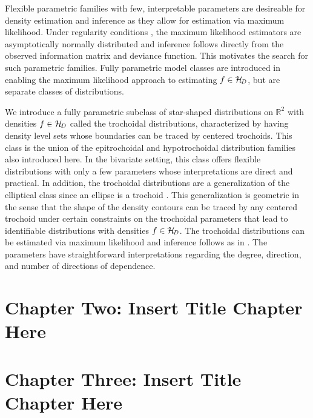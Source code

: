 \documentclass[]{article}
\numberwithin{equation}{section}
\newcommand{\HC}[1]{\cal{H}\!_{\mathit{#1}}} %
\newcommand{\R}{\mathbb{R}} %
\begin{document}
Flexible parametric families with few, interpretable parameters are desireable for density estimation and inference as they allow for estimation via maximum likelihood. Under regularity conditions \citep[Section 6.1]{Hogg2005}, the maximum likelihood estimators are asymptotically normally distributed and inference follows directly from the observed information matrix and deviance function. This motivates the search for such parametric families. Fully parametric model classes are introduced in \citet{Liebscher2020} enabling the maximum likelihood approach to estimating \(f \in \HC{D}\), but are separate classes of distributions.

We introduce a fully parametric subclass of star-shaped distributions on \(\R^2\) with densities \(f \in \HC{D}\) called the trochoidal distributions, characterized by having density level sets whose boundaries can be traced by centered trochoids. This class is the union of the epitrochoidal and hypotrochoidal distribution families also introduced here. In the bivariate setting, this class offers flexible distributions with only a few parameters whose interpretations are direct and practical. In addition, the trochoidal distributions are a generalization of the elliptical class since an ellipse is a trochoid \citep{Pedoe1975}. This generalization is geometric in the sense that the shape of the density contours can be traced by any centered trochoid under certain constraints on the trochoidal parameters that lead to identifiable distributions with densities \(f \in \HC{D}\). The trochoidal distributions can be estimated via maximum likelihood and inference follows as in \citet{Liebscher2020}. The parameters have straightforward interpretations regarding the degree, direction, and number of directions of dependence.

\clearpage

\hypertarget{chapter-two-insert-title-chapter-here}{%
\section{Chapter Two: Insert Title Chapter Here}\label{chapter-two-insert-title-chapter-here}}

\renewcommand{\thefigure}{2.\arabic{figure}}
\setcounter{figure}{0}
\renewcommand{\thetable}{2.\arabic{table}}
\setcounter{table}{0}
\renewcommand{\theequation}{2.\arabic{equation}}
\setcounter{equation}{0}

\clearpage

\hypertarget{chapter-three-insert-title-chapter-here}{%
\section{Chapter Three: Insert Title Chapter Here}\label{chapter-three-insert-title-chapter-here}}
\end{document}
